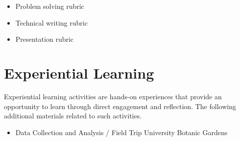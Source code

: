 \documentclass[
  a4paper,
  DIV=11,
  numbers=noendperiod,
  oneside]{scrreprt}
\providecommand{\tightlist}{%
  \setlength{\itemsep}{0pt}\setlength{\parskip}{0pt}}
\begin{document}
\begin{itemize}
\tightlist
\item
  Problem solving rubric
\item
  Technical writing rubric
\item
  Presentation rubric
\end{itemize}





\chapter{Experiential Learning}\label{sec-activities}

Experiential learning activities are hands-on experiences that provide
an opportunity to learn through direct engagement and reflection. The
following additional materials related to such activities.

\begin{itemize}
\tightlist
\item
  Data Collection and Analysis / Field Trip University Botanic Gardens
\end{itemize}


\end{document}
